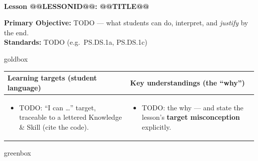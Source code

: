 \documentclass[10pt]{article}
\makeatletter
\newcommand{\LessonNumberName}{Lesson @@LESSONID@@: @@TITLE@@}
\makeatother
\begin{document}
\begin{center}
    {\Large\bfseries \CourseName \\
    {\small\bfseries \UnitNumberName \LessonNumberName}}
\end{center}

\begin{tcolorbox}[colback=frost, colframe=cerulean, boxrule=0.9pt, arc=2mm,
    left=2mm, right=2mm, top=1.5mm, bottom=1.5mm]
    \textbf{Primary Objective:} TODO --- what students can do, interpret, and \emph{justify}
    by the end.
    \\[2pt]
    \textbf{Standards:} TODO (e.g.\ PS.DS.1a, PS.DS.1c)
\end{tcolorbox}

\renewcommand{\arraystretch}{1.4}
\begin{skillbox}{goldbox}
\begin{tabularx}{\linewidth}{@{}X|X@{}}
\textbf{Learning targets (student language)} & \textbf{Key understandings (the ``why'')} \\[2pt]
\hline
\vspace{-6pt}
\begin{itemize}[leftmargin=1.1em, nosep, after=\vspace{2pt}]
  \item TODO: ``I can \dots'' target, traceable to a lettered Knowledge \& Skill (cite the code).
\end{itemize}
&
\vspace{-6pt}
\begin{itemize}[leftmargin=1.1em, nosep, after=\vspace{2pt}]
  \item TODO: the why --- and state the lesson's \textbf{target misconception} explicitly.
\end{itemize}
\end{tabularx}
\end{skillbox}

\begin{skillbox}{greenbox}
\end{skillbox}
\end{document}
